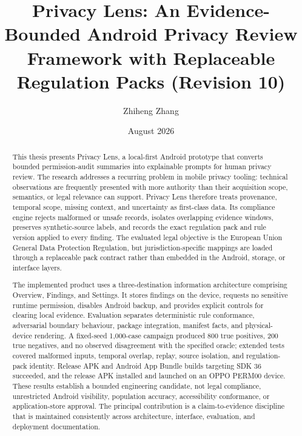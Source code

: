 \documentclass[11pt,a4paper]{article}
\title{Privacy Lens: An Evidence-Bounded Android Privacy Review Framework with Replaceable Regulation Packs (Revision 10)}
\author{Zhiheng Zhang}
\date{August 2026}
\begin{document}
\maketitle
\begin{abstract}
This thesis presents Privacy Lens, a local-first Android prototype that converts bounded permission-audit summaries into explainable prompts for human privacy review. The research addresses a recurring problem in mobile privacy tooling: technical observations are frequently presented with more authority than their acquisition scope, semantics, or legal relevance can support. Privacy Lens therefore treats provenance, temporal scope, missing context, and uncertainty as first-class data. Its compliance engine rejects malformed or unsafe records, isolates overlapping evidence windows, preserves synthetic-source labels, and records the exact regulation pack and rule version applied to every finding. The evaluated legal objective is the European Union General Data Protection Regulation, but jurisdiction-specific mappings are loaded through a replaceable pack contract rather than embedded in the Android, storage, or interface layers.

The implemented product uses a three-destination information architecture comprising Overview, Findings, and Settings. It stores findings on the device, requests no sensitive runtime permission, disables Android backup, and provides explicit controls for clearing local evidence. Evaluation separates deterministic rule conformance, adversarial boundary behaviour, package integration, manifest facts, and physical-device rendering. A fixed-seed 1,000-case campaign produced 800 true positives, 200 true negatives, and no observed disagreement with the specified oracle; extended tests covered malformed inputs, temporal overlap, replay, source isolation, and regulation-pack identity. Release APK and Android App Bundle builds targeting SDK 36 succeeded, and the release APK installed and launched on an OPPO PERM00 device. These results establish a bounded engineering candidate, not legal compliance, unrestricted Android visibility, population accuracy, accessibility conformance, or application-store approval. The principal contribution is a claim-to-evidence discipline that is maintained consistently across architecture, interface, evaluation, and deployment documentation.
\end{abstract}
\newpage
\tableofcontents
\newpage









\end{document}
